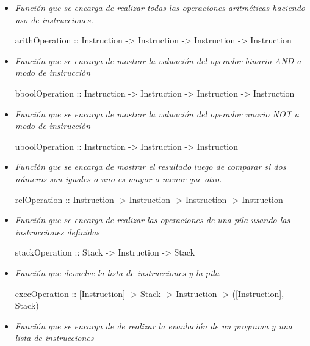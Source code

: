 \documentclass[12pt, letterpaper]{article}
\begin{document}
  \begin{itemize}
    \item \textit{Función que se encarga de realizar todas las operaciones
                  aritméticas haciendo uso de instrucciones.}\vspace{.05cm}

                  arithOperation :: Instruction -> Instruction -> Instruction -> Instruction

    \item \textit{Función que se encarga de mostrar la valuación del operador
                  binario AND a modo de instrucción}\vspace{.05cm}

                  bboolOperation :: Instruction -> Instruction -> Instruction -> Instruction

    \item \textit{Función que se encarga de mostrar la valuación del operador
                  unario NOT a modo de instrucción}\vspace{.05cm}

                  uboolOperation :: Instruction -> Instruction -> Instruction

    \item \textit{Función que se encarga de mostrar el resultado luego de
                    comparar si dos números son iguales o uno es mayor o menor
                    que otro.}\vspace{.05cm}

                    relOperation :: Instruction -> Instruction -> Instruction -> Instruction

    \item \textit{Función que se encarga de realizar las operaciones de una
                    pila usando las instrucciones definidas}\vspace{.05cm}

                    stackOperation :: Stack -> Instruction -> Stack

    \item \textit{Función que devuelve la lista de instrucciones y la pila}\vspace{.05cm}

                    execOperation :: [Instruction] -> Stack -> Instruction -> ([Instruction], Stack)

    \item \textit{Función que se encarga de de realizar la evaulación de un
                    programa y una lista de instrucciones}\vspace{.05cm}


\end{itemize}
\end{document}
